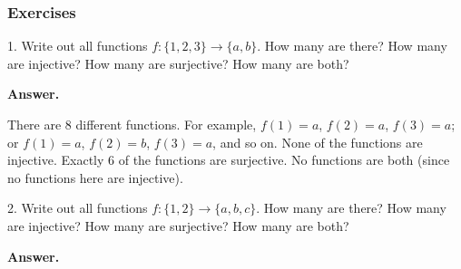 \documentclass[10pt,]{book}
\theoremstyle{plain}
\theoremstyle{definition}
\theoremstyle{definition}
\theoremstyle{definition}
\numberwithin{equation}{section}
\begin{document}
\subsubsection[Exercises]{Exercises}\label{exercises-2}
\begin{exerciselist}
\item[1.]\hypertarget{exercise-17}{}
Write out all functions \(f: \{1,2,3\} \to \{a,b\}\). How many are there? How many are injective? How many are surjective? How many are both?
%
\par\smallskip
\par\smallskip
\noindent\textbf{Answer.}\hypertarget{answer-17}{}\quad

There are 8 different functions. For example, \(f(1) = a\), \(f(2) = a\), \(f(3) = a\); or \(f(1) = a\), \(f(2) = b\), \(f(3) = a\), and so on. None of the functions are injective. Exactly 6 of the functions are surjective. No functions are both (since no functions here are injective).
%
\item[2.]\hypertarget{exercise-18}{}
Write out all functions \(f: \{1,2\} \to \{a,b,c\}\). How many are there? How many are injective? How many are surjective? How many are both?
%
\par\smallskip
\par\smallskip
\noindent\textbf{Answer.}\hypertarget{answer-18}{}\quad


\end{exerciselist}
\end{document}
